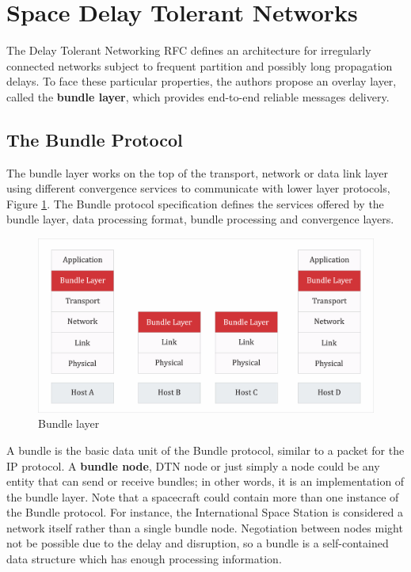 \section{Space Delay Tolerant Networks}
\label{sec:dtn}

The Delay Tolerant Networking RFC \cite{cerf2007delay} defines an architecture for irregularly connected networks subject to frequent partition and possibly long propagation delays. To face these particular properties, the authors propose an overlay layer, called the \textbf{bundle layer}, which provides end-to-end reliable messages delivery. 


\subsection{The Bundle Protocol}

The bundle layer works on the top of the transport, network or data link layer using different convergence services to communicate with lower layer protocols, Figure \ref{fig:bundle}. The Bundle protocol specification \cite{rfc5050} defines the services offered by the bundle layer, data processing format, bundle processing and convergence layers. 

\begin{figure}[ht]
\centering
\includegraphics[width=1 \linewidth]{images/bundle.png} 
\caption{Bundle layer}
\label{fig:bundle}
\end{figure}

A bundle is the basic data unit of the Bundle protocol, similar to a packet for the IP protocol. A \textbf{bundle node}, DTN node or just simply a node could be any entity that can send or receive bundles; in other words, it is an implementation of the bundle layer. Note that a spacecraft could contain more than one instance of the Bundle protocol. For instance, the International Space Station is considered a network itself rather than a single bundle node. Negotiation between nodes might not be possible due to the delay and disruption, so a bundle is a self-contained data structure which has enough processing information.


